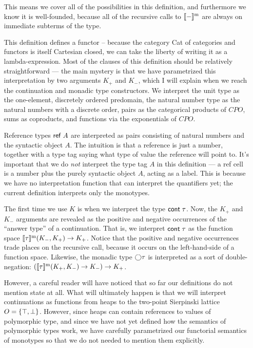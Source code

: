 This means we cover all of the possibilities in this definition, and
furthermore we know it is well-founded, because all of the recursive
calls to $[\![{-}]\!]^{\mathrm{m}}$ are always on immediate subterms of the
type.

This definition defines a functor -- because the category Cat of
categories and functors is itself Cartesian closed, we can take the
liberty of writing it as a lambda-expression. Most of the clauses of
this definition should be relatively straightforward --- the main
mystery is that we have parametrized this interpretation by two
arguments $K_+$ and $K_-$, which I will explain when we reach the
continuation and monadic type constructors.  We interpret the unit
type as the one-element, discretely ordered predomain, the natural
number type as the natural numbers with a discrete order, pairs as the
categorical products of $CPO$, sums as coproducts, and functions via
the exponentials of $CPO$.

Reference types $\mathsf{ref}\;A$ are interpreted as pairs consisting of
natural numbers and the syntactic object $A$. The intuition is that a
reference is just a number, together with a type tag saying what type
of value the reference will point to. It's important that we do
\emph{not} interpret the type tag $A$ in this definition --- a ref
cell is a number plus the purely syntactic object $A$, acting as a
label. This is because we have no interpretation function that can 
interpret the quantifiers yet; the current definition interprets only
the monotypes. 

The first time we use $K$ is when we interpret the type $\mathsf{cont}\;{\tau}$.
Now, the $K_+$ and $K_-$ arguments are revealed as the positive and
negative occurrences of the ``answer type'' of a continuation. That is,
we interpret $\mathsf{cont}\;{\tau}$ as the function space
$[\![{\tau}]\!]^{\mathrm{m}}(K_-, K_+) \to K_+$.  Notice that the positive and
negative occurrences trade places on the recursive call, because it
occurs on the left-hand-side of a function space. Likewise, the
monadic type $\bigcirc{\tau}$ is interpreted as a sort of
double-negation: $([\![{\tau}]\!]^{\mathrm{m}}(K_+, K_-) \to K_-) \to K_+$.

However, a careful reader will have noticed that so far our
definitions do not mention state at all. What will ultimately happen
is that we will interpret continuations as functions from heaps to the
two-point Sierpinski lattice $O = \{{\top, \bot}\}$. However, since
heaps can contain references to values of polymorphic type, and since
we have not yet defined how the semantics of polymorphic types work, we
have carefully parametrized our functorial semantics of monotypes so
that we do not needed to mention them explicitly. 

